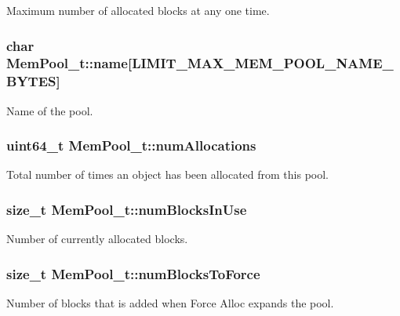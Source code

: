 Maximum number of allocated blocks at any one time. 

\subsubsection[{\texorpdfstring{name}{name}}]{\setlength{\rightskip}{0pt plus 5cm}char Mem\+Pool\+\_\+t\+::name\mbox{[}{\bf L\+I\+M\+I\+T\+\_\+\+M\+A\+X\+\_\+\+M\+E\+M\+\_\+\+P\+O\+O\+L\+\_\+\+N\+A\+M\+E\+\_\+\+B\+Y\+T\+ES}\mbox{]}}\hypertarget{struct_mem_pool__t_a216ed38243abe9e06bb4da632f9f4fe2}{}\label{struct_mem_pool__t_a216ed38243abe9e06bb4da632f9f4fe2}


Name of the pool. 

\subsubsection[{\texorpdfstring{num\+Allocations}{numAllocations}}]{\setlength{\rightskip}{0pt plus 5cm}uint64\+\_\+t Mem\+Pool\+\_\+t\+::num\+Allocations}\hypertarget{struct_mem_pool__t_ad695ba4571ede58f4b9c8d5ac5b5f29b}{}\label{struct_mem_pool__t_ad695ba4571ede58f4b9c8d5ac5b5f29b}
Total number of times an object has been allocated from this pool. 
\subsubsection[{\texorpdfstring{num\+Blocks\+In\+Use}{numBlocksInUse}}]{\setlength{\rightskip}{0pt plus 5cm}size\+\_\+t Mem\+Pool\+\_\+t\+::num\+Blocks\+In\+Use}\hypertarget{struct_mem_pool__t_a42d4e1c8515867a659186e7e0e9a8e63}{}\label{struct_mem_pool__t_a42d4e1c8515867a659186e7e0e9a8e63}


Number of currently allocated blocks. 

\subsubsection[{\texorpdfstring{num\+Blocks\+To\+Force}{numBlocksToForce}}]{\setlength{\rightskip}{0pt plus 5cm}size\+\_\+t Mem\+Pool\+\_\+t\+::num\+Blocks\+To\+Force}\hypertarget{struct_mem_pool__t_a27ee133a83711385f3f9d6520ab4b4b3}{}\label{struct_mem_pool__t_a27ee133a83711385f3f9d6520ab4b4b3}
Number of blocks that is added when Force Alloc expands the pool. 
